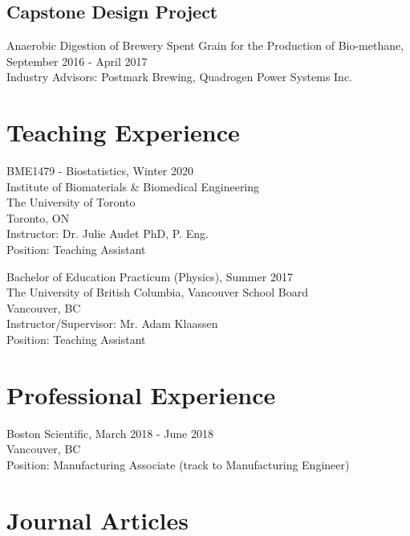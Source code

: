 \documentclass[letterpaper]{article}
\renewenvironment{itemize}{
  \begin{list}{}{
    \setlength{\leftmargin}{1.5em}
  }
}{
  \end{list}
}
\begin{document}
\subsection*{Capstone Design Project}

\begin{itemize}
\item Anaerobic Digestion of Brewery Spent Grain for the Production of Bio-methane, September 2016 - April 2017
\\ Industry Advisors: Postmark Brewing, Quadrogen Power Systems Inc.
\end{itemize}

\section*{\textbf{Teaching Experience}}
\begin{itemize}
    \item BME1479 - Biostatistics, Winter 2020
    \\Institute of Biomaterials \& Biomedical Engineering
    \\The University  of Toronto
    \\Toronto, ON
    \\Instructor: Dr. Julie Audet PhD, P. Eng.
    \\Position: Teaching Assistant
    \item Bachelor of Education Practicum (Physics), Summer 2017
    \\ The University of British Columbia, Vancouver School Board
    \\ Vancouver, BC
    \\ Instructor/Supervisor: Mr. Adam Klaassen
    \\ Position: Teaching Assistant
\end{itemize}

\section*{\textbf{Professional Experience}}

\begin{itemize}
\item Boston Scientific, March 2018 - June 2018
\\Vancouver, BC
\\Position: Manufacturing Associate (track to Manufacturing Engineer)
\end{itemize}

\section*{\textbf{Journal Articles}}
\end{document}
